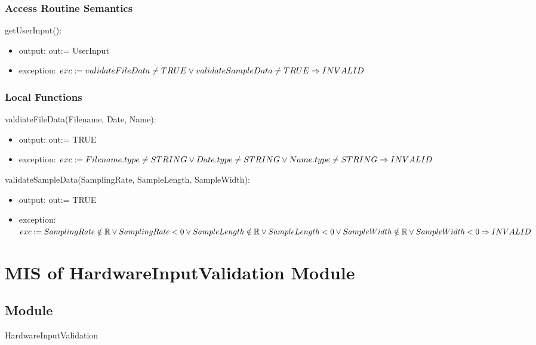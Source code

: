 \documentclass[12pt, titlepage]{article}
\begin{document}
\subsubsection{Access Routine Semantics}

\noindent getUserInput():
\begin{itemize}
\item output: out:= UserInput
\item exception: $exc:= 
validateFileData \ne TRUE  \lor\\
validateSampleData \ne TRUE \\
\Rightarrow INVALID$
\end{itemize}


\subsubsection{Local Functions}
\noindent valdiateFileData(Filename, Date, Name):
\begin{itemize}
\item output: out:= TRUE
\item exception: $exc:= 
Filename.type \ne STRING \lor \\
Date.type \ne STRING  \lor \\
Name.type \ne STRING  \\
\Rightarrow INVALID$
\end{itemize}

\noindent validateSampleData(SamplingRate, SampleLength, SampleWidth):
\begin{itemize}
\item output: out:= TRUE
\item exception: $exc:= 
SamplingRate \notin \mathbb{R} \lor SamplingRate < 0 \lor \\
SampleLength \notin \mathbb{R} \lor SampleLength < 0  \lor \\
SampleWidth \notin \mathbb{R} \lor SampleWidth < 0  \\
\Rightarrow INVALID$
\end{itemize}
\newpage


\section{MIS of HardwareInputValidation Module} \label{HI}
\subsection{Module}

HardwareInputValidation
\end{document}
